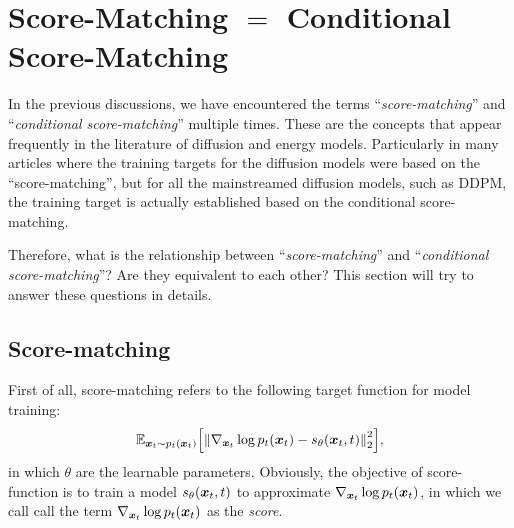 \section{Score-Matching $=$ Conditional Score-Matching}

In the previous discussions, we have encountered the terms ``\textit{score-matching}'' and ``\textit{conditional score-matching}'' multiple times. These are the concepts that appear frequently in the literature of diffusion and energy models. Particularly in many articles where the training targets for the diffusion models were based on the ``score-matching'', but for all the mainstreamed diffusion models, such as DDPM, the training target is actually established based on the conditional score-matching.

Therefore, what is the relationship between ``\textit{score-matching}'' and ``\textit{conditional score-matching}''? Are they equivalent to each other? This section will try to answer these questions in details.

\subsection{Score-matching}

First of all, score-matching refers to the following target function for model training:
\begin{equation}
\label{eq:18.1}
    \mathbb{E}_{\bm{x}_{t}\sim p_t(\bm{x}_{t})}\Bigl[\left\| \nabla_{\bm{x}_{t}}\log p_t(\bm{x}_{t})-s_\theta(\bm{x}_{t},t)\right\|_2^2 \Bigr],
\end{equation}
in which $\theta$ are the learnable parameters. Obviously, the objective of score-function is to train a model $s_\theta(\bm{x}_{t},t)$ to approximate $\nabla_{\bm{x}_{t}}\log p_t(\bm{x}_{t})$, in which we call call the term $\nabla_{\bm{x}_{t}}\log p_t(\bm{x}_{t})$ as the \textit{score}.

